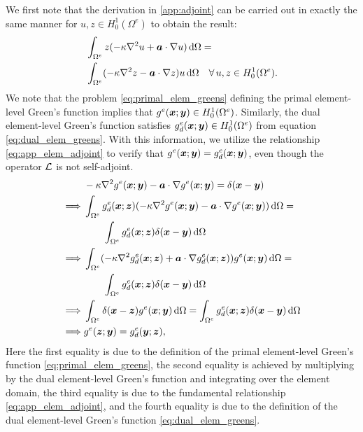 We first note that
the derivation in \ref{app:adjoint} can
be carried out in exactly the same manner
for $u,z \in H^1_0(\Omega^e)$ to obtain the result:
%
\begin{gather}
\begin{aligned}
&\int_{\Omega^e} z(-\kappa \nabla^2 {u} + \boldsymbol{a} \cdot \nabla {u}) \, \text{d} \Omega = \\
&\int_{\Omega^e} (-\kappa \nabla^2 {z} - \boldsymbol{a} \cdot \nabla {z}) u \, \text{d} \Omega
\quad \forall \, u,z \in H^1_0(\Omega^e).
\end{aligned}
\label{eq:app_elem_adjoint}
\end{gather}
%
We note that the problem \eqref{eq:primal_elem_greens}
defining the primal element-level Green's function implies that
$g^e(\boldsymbol{x}; \boldsymbol{y}) \in H^1_0(\Omega^e)$.
Similarly, the dual element-level Green's function satisfies
$g^e_d(\boldsymbol{x}; \boldsymbol{y}) \in H^1_0(\Omega^e)$ from equation
\eqref{eq:dual_elem_greens}. With this information,
we utilize the relationship \eqref{eq:app_elem_adjoint} to verify
that $g^e(\boldsymbol{x}; \boldsymbol{y}) = g^e_d(\boldsymbol{x}; \boldsymbol{y})$, even though
the operator $\mathcal{L}$ is not self-adjoint.
%
\begin{gather*}
\begin{aligned}
&-\kappa \nabla^2 { g^e(\boldsymbol{x}; \boldsymbol{y}) } - \boldsymbol{a} \cdot \nabla { g^e(\boldsymbol{x}; \boldsymbol{y}) }
=
\delta(\boldsymbol{x} - \boldsymbol{y}) \\
\implies &\int_{\Omega^e}
g^e_d(\boldsymbol{x}; \boldsymbol{z}) (-\kappa \nabla^2 { g^e(\boldsymbol{x}; \boldsymbol{y}) } - \boldsymbol{a} \cdot \nabla { g^e(\boldsymbol{x}; \boldsymbol{y}) })
\, \text{d} \Omega
= \\
& \quad \quad \int_{\Omega^e}
g^e_d(\boldsymbol{x}; \boldsymbol{z}) \delta(\boldsymbol{x} - \boldsymbol{y})
\, \text{d} \Omega \\
\implies
& \int_{\Omega^e} (-\kappa \nabla^2 { g^e_d(\boldsymbol{x}; \boldsymbol{z})} + \boldsymbol{a} \cdot \nabla { g^e_d(\boldsymbol{x}; \boldsymbol{z})}) g^e(\boldsymbol{x}; \boldsymbol{y})
\, \text{d} \Omega
= \\
& \quad \quad \int_{\Omega^e}
g^e_d(\boldsymbol{x}; \boldsymbol{z}) \delta(\boldsymbol{x} - \boldsymbol{y})
\, \text{d} \Omega \\
\implies
& \int_{\Omega^e} \delta(\boldsymbol{x} - \boldsymbol{z}) g^e(\boldsymbol{x}; \boldsymbol{y})
\, \text{d} \Omega
=
\int_{\Omega^e}
g^e_d(\boldsymbol{x}; \boldsymbol{z}) \delta(\boldsymbol{x} - \boldsymbol{y})
\, \text{d} \Omega \\
\implies
& g^e(\boldsymbol{z}; \boldsymbol{y})
= g^e_d(\boldsymbol{y}; \boldsymbol{z}),
\end{aligned}
\end{gather*}
%
Here the first equality is due to the definition of the
primal element-level Green's function \eqref{eq:primal_elem_greens},
the second equality is achieved by multiplying by the dual
element-level Green's function and integrating over the element domain,
the third equality is due to the fundamental relationship
\eqref{eq:app_elem_adjoint}, and the fourth equality is due to the
definition of the dual element-level Green's function
\eqref{eq:dual_elem_greens}.
